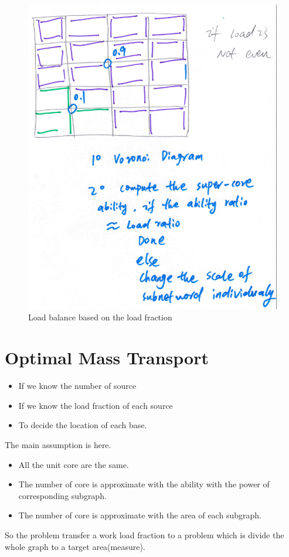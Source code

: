 \documentclass[preprint,12pt]{elsarticle}
\begin{document}
\begin{figure}[h]
\centering\includegraphics[width=0.7\linewidth]{voronoi2}
\caption{Load balance based on the load fraction}
\label{voronoi2}
\end{figure}

\section{Optimal Mass Transport}

\begin{itemize}
\item If we know the number of source
\item If we know the load fraction of each source
\item To decide the location of each base.
\end{itemize}

The main assumption is here. 

\begin{itemize}
\item All the unit core are the same.
\item The number of core is approximate with the ability with the power of corresponding subgraph.
\item The number of core is approximate with the area of each subgraph.
\end{itemize}

So the problem transfer a work load fraction to a problem which is divide the whole graph to a target area(measure).
\end{document}
